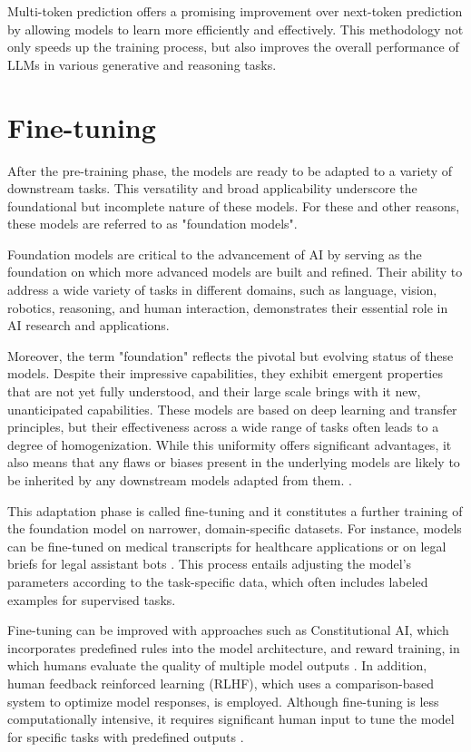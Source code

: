 Multi-token prediction offers a promising improvement over next-token prediction by allowing models to learn more efficiently and effectively. This methodology not only speeds up the training process, but also improves the overall performance of LLMs in various generative and reasoning tasks.

\section{Fine-tuning}

After the pre-training phase, the models are ready to be adapted to a variety of downstream tasks. This versatility and broad applicability underscore the foundational but incomplete nature of these models. For these and other reasons, these models are referred to as "foundation models".

Foundation models are critical to the advancement of AI by serving as the foundation on which more advanced models are built and refined. Their ability to address a wide variety of tasks in different domains, such as language, vision, robotics, reasoning, and human interaction, demonstrates their essential role in AI research and applications.

Moreover, the term "foundation" reflects the pivotal but evolving status of these models. Despite their impressive capabilities, they exhibit emergent properties that are not yet fully understood, and their large scale brings with it new, unanticipated capabilities. These models are based on deep learning and transfer principles, but their effectiveness across a wide range of tasks often leads to a degree of homogenization. While this uniformity offers significant advantages, it also means that any flaws or biases present in the underlying models are likely to be inherited by any downstream models adapted from them. \cite{bommasani2021opportunities}.

This adaptation phase is called fine-tuning and it constitutes a further training of the foundation model on narrower, domain-specific datasets. For instance, models can be fine-tuned on medical transcripts for healthcare applications or on legal briefs for legal assistant bots \cite{radford2019language}. This process entails adjusting the model's parameters according to the task-specific data, which often includes labeled examples for supervised tasks.

Fine-tuning can be improved with approaches such as Constitutional AI, which incorporates predefined rules into the model architecture, and reward training, in which humans evaluate the quality of multiple model outputs \cite{bai2022constitutional}. In addition, human feedback reinforced learning (RLHF), which uses a comparison-based system to optimize model responses, is employed. Although fine-tuning is less computationally intensive, it requires significant human input to tune the model for specific tasks with predefined outputs \cite{ouyang2022training}.

